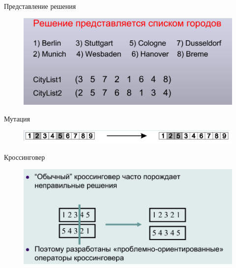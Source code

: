 \documentclass{beamer}
\begin{document}
\begin{frame}{Представление решения}
\begin{figure}[h]
\centering
\includegraphics[scale=0.4]{images/lec04-pic38.png}
\end{figure}
\end{frame}

\begin{frame}{Мутация}
\begin{figure}[h]
\centering
\includegraphics[scale=0.4]{images/lec04-pic39.png}
\end{figure}
\end{frame}

\begin{frame}{Кроссинговер}
\begin{figure}[h]
\centering
\includegraphics[scale=0.4]{images/lec04-pic40.png}
\end{figure}
\end{frame}
\end{document}
